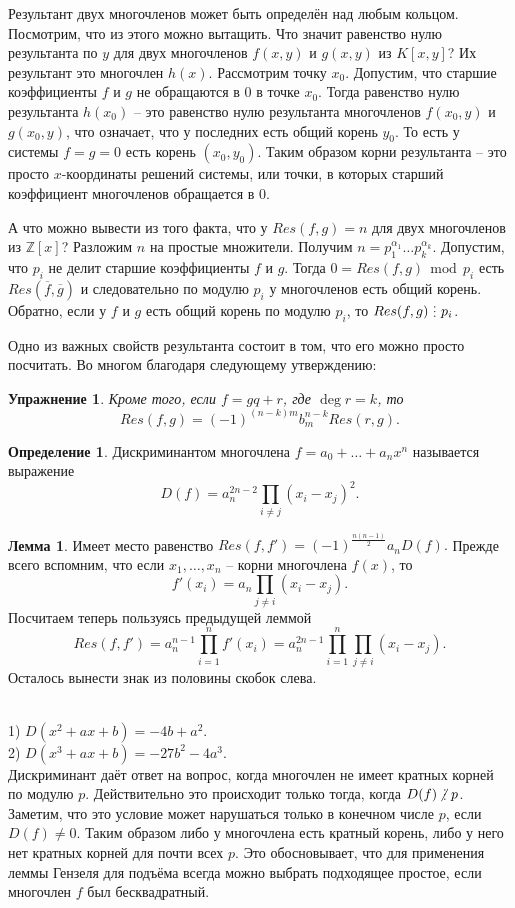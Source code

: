 \documentclass[10pt,a4paper,oneside]{book}
\newtheorem{upr}{Упражнение}
\theoremstyle{definition}
\newtheorem*{defn}{{\color{yellow!30!red} Определение}}
\newtheorem{lem}{{\color{green!50!black} Лемма}}
\renewcommand{\mod}{\,\operatorname{mod}\,}
\newcommand{\mb}[1]{\mathbb{#1}}
\newcommand{\ovl}{\overline}
\newcommand{\di}{\mathop{\,\scalebox{0.85}{\raisebox{-1.2pt}[0.5\height]{\vdots}}\,}}
\newcommand{\ndi}{\mathop{\not\scalebox{0.85}{\raisebox{-1.2pt}[0.5\height]{\vdots}}\,}}
\def\exm{\noindent {\bf Примеры:}}
\def\dfn{\begin{defn}}
\def\edfn{\end{defn}}
\def\lm{\begin{lem}}
\def\elm{\end{lem}}
\def\bupr{\begin{upr}}
\def\eupr{\end{upr}}
\begin{document}
\endproof



Результант двух многочленов может быть определён над любым кольцом. Посмотрим, что из этого можно вытащить. Что значит равенство нулю результанта по $y$ для двух многочленов $f(x,y) $ и $g(x,y)$ из $K[x,y]$? Их результант это многочлен $h(x)$. Рассмотрим точку $x_0$. Допустим, что старшие коэффициенты $f$ и $g$ не обращаются в 0 в точке $x_0$. Тогда равенство нулю результанта $h(x_0)$ -- это равенство нулю результанта многочленов $f(x_0,y)$ и $g(x_0,y)$, что означает, что у последних есть общий корень $y_0$. То есть у системы $f=g=0$ есть корень $(x_0,y_0)$. Таким образом корни результанта -- это  просто $x$-координаты решений системы, или точки, в которых старший коэффициент многочленов обращается в 0.


А что можно вывести из того факта, что у $Res(f,g)=n$ для двух многочленов из $\mb Z[x]$? Разложим $n$ на простые множители. Получим $n=p_1^{\alpha_1} \dots p_k^{\alpha_k}$. Допустим, что $p_i$ не делит старшие коэффициенты $f$ и $g$. Тогда $0=Res(f,g) \mod p_i $ есть $Res(\ovl{f}, \ovl{g})$ и следовательно по модулю $p_i$ у многочленов есть общий корень. Обратно, если у $f$ и $g$ есть общий корень по модулю $p_i$, то $Res(f,g)\di p_i$.

Одно из важных свойств результанта состоит в том, что его можно просто посчитать. Во многом благодаря следующему утверждению:

\bupr Кроме того, если $f=gq+r$, где $\deg r=k$, то 
 $$Res(f,g)=(-1)^{(n-k)m}b_m^{n-k} Res(r,g).$$
\eupr

\dfn Дискриминантом многочлена $f=a_0+\dots +a_nx^n$ называется выражение 
$$D(f)=a_n^{2n-2}\prod_{i\neq j} (x_i-x_j)^2.$$
\edfn

\lm Имеет место равенство $Res(f,f')=(-1)^{\frac{n(n-1)}{2}} a_n D(f).$
\proof Прежде всего вспомним, что если $x_1,\dots,x_n$ -- корни многочлена $f(x)$, то $$f'(x_i)=a_n\prod_{j\neq i}(x_i-x_j).$$
Посчитаем теперь пользуясь предыдущей леммой 
$$Res(f,f')= a_n^{n-1}\prod_{i=1}^n f'(x_i)=a_n^{2n-1} \prod_{i=1}^n \prod_{j\neq i} (x_i-x_j).$$
Осталось вынести знак из половины скобок слева.
\endproof
\elm

\exm\\
1) $D(x^2+ax+b)=-4b+a^2$.\\
2) $D(x^3+ax+b)=-27b^2-4a^3$.\\


Дискриминант даёт ответ на вопрос, когда многочлен не имеет кратных корней по модулю $p$. Действительно это происходит только тогда, когда $D(f)\ndi p$. Заметим, что это условие может нарушаться только в конечном числе $p$, если $D(f)\neq 0$. Таким образом либо у многочлена есть кратный корень, либо у него нет кратных корней для почти всех $p$. Это обосновывает, что для применения леммы Гензеля для подъёма всегда можно выбрать подходящее простое, если многочлен $f$ был бесквадратный.
\end{document}
